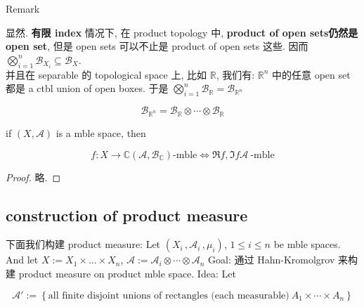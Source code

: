 \documentclass{qlnotes-export}
\begin{document}
\begin{qlremark}{Remark}

显然. \textbf{有限 index} 情况下, 在 product topology 中, \textbf{product of open sets仍然是 open set}, 但是 open sets 可以不止是 product of open sets 这些. 因而 \(\bigotimes_{i = 1}^{n}\mathcal{B}_{X_{i}} \subseteq \mathcal{B}_{X}\).\\
并且在 separable 的 topological space 上, 比如 \(\mathbb{R}\), 我们有: \({\mathbb{R}}^{n}\) 中的任意 open set 都是 a ctbl union of open boxes. 于是 \(\bigotimes_{i = 1}^{n}\mathcal{B}_{\mathbb{R}} = \mathcal{B}_{{\mathbb{R}}^{n}}\)

\end{qlremark}

\begin{example}

\[\mathcal{B}_{{\mathbb{R}}^{n}} = \mathcal{B}_{\mathbb{R}} \otimes \cdots \otimes \mathcal{B}_{\mathbb{R}}\]

\end{example}

\begin{corollary}

if \((X,\mathcal{A})\) is a mble space, then

\[f:X\rightarrow{\mathbb{C}}(\mathcal{A},\mathcal{B}_{\mathbb{C}})\text{-mble}\Leftrightarrow\Re f,\Im f\mathcal{A}\ \text{-mble}\]

\end{corollary}

\begin{proof}

略.

\end{proof}

\subsection{construction of product measure}\label{construction-of-product-measure}

下面我们构建 product measure: Let \((X_{i}\,,\mathcal{A}_{i}\,,\mu_{i})\), \(1 \leq i \leq n\) be mble spaces.\\
And let \(X := X_{1} \times ... \times X_{n}\), \(\mathcal{A} := \mathcal{A}_{i} \otimes \cdots \otimes \mathcal{A}_{n}\) Goal: 通过 Hahn-Kromolgrov 来构建 product measure on product mble space. Idea: Let

\[\mathcal{A}' := \left\{ {\text{all finite disjoint unions of rectangles (each measurable)}\ A_{1} \times \cdots \times A_{n}} \right\}\]
\end{document}
